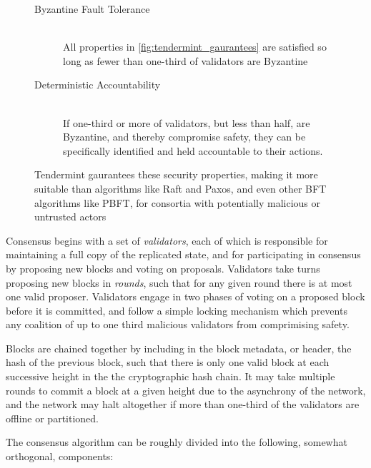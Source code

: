 \begin{figure}[]
	\begin{description}
	  \item[Byzantine Fault Tolerance] \hfill \\
		All properties in \ref{fig:tendermint_gaurantees} are satisfied so long as fewer than one-third of validators are Byzantine
	  \item[Deterministic Accountability] \hfill \\
		If one-third or more of validators, but less than half, are Byzantine, and thereby compromise safety, 
		they can be specifically identified and held accountable to their actions.
	\end{description}
	\label{fig:tendermint_security}
  \caption{Tendermint gaurantees these security properties, making it more suitable than algorithms like Raft and Paxos, and even other BFT algorithms like PBFT, for consortia with potentially malicious or untrusted actors}
\end{figure}


Consensus begins with a set of \emph{validators}, each of which is responsible for maintaining a full copy of the replicated state,
and for participating in consensus by proposing new blocks and voting on proposals.
Validators take turns proposing new blocks in \emph{rounds}, such that for any given round there is at most one valid proposer.
Validators engage in two phases of voting on a proposed block before it is committed, 
and follow a simple locking mechanism which prevents any coalition of up to one third malicious validators from comprimising safety.

Blocks are chained together by including in the block metadata, or header, the hash of the previous block,
such that there is only one valid block at each successive height in the the cryptographic hash chain.
It may take multiple rounds to commit a block at a given height due to the asynchrony of the network,
and the network may halt altogether if more than one-third of the validators are offline or partitioned.

The consensus algorithm can be roughly divided into the following, somewhat orthogonal, components:


